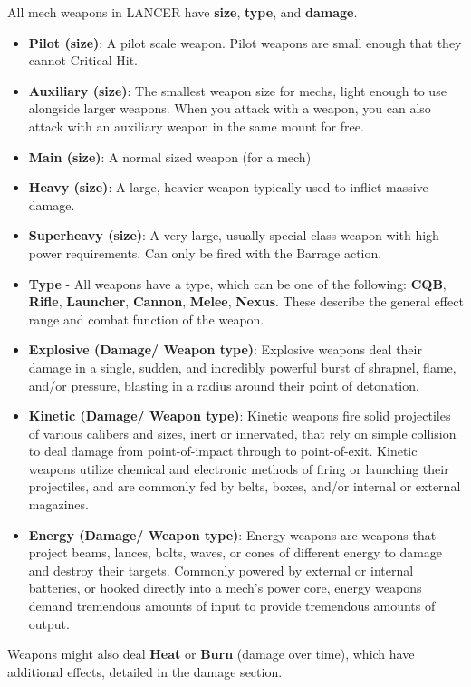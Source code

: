 All mech weapons in LANCER have \textbf{size}, \textbf{type}, and \textbf{damage}. 
\begin{itemize}
\item \textbf{Pilot (size)}: A pilot scale weapon. Pilot weapons are small enough that they cannot Critical Hit. 
\item \textbf{Auxiliary (size)}: The smallest weapon size for mechs, light enough to use alongside larger weapons. When you attack with a weapon, you can also attack with an auxiliary weapon in the same mount for free.
\item \textbf{Main (size)}: A normal sized weapon (for a mech)
\item \textbf{Heavy (size)}: A large, heavier weapon typically used to inflict massive damage.
\item \textbf{Superheavy (size)}: A very large, usually special-class weapon with high power requirements. Can only be fired with the Barrage action. 
\item \textbf{Type} - All weapons have a type, which can be one of the following: \textbf{CQB}, \textbf{Rifle}, \textbf{Launcher}, \textbf{Cannon}, \textbf{Melee}, \textbf{Nexus}. These describe the general effect range and combat function of the weapon. 
\item \textbf{Explosive (Damage/ Weapon type)}: Explosive weapons deal their damage in a single, sudden, and incredibly powerful burst of shrapnel, flame, and/or pressure, blasting in a radius around their point of detonation.
\item \textbf{Kinetic (Damage/ Weapon type)}: Kinetic weapons fire solid projectiles of various calibers and sizes, inert or innervated, that rely on simple collision to deal damage from point-of-impact through to point-of-exit. Kinetic weapons utilize chemical and electronic methods of firing or launching their projectiles, and are commonly fed by belts, boxes, and/or internal or external magazines.
\item \textbf{Energy (Damage/ Weapon type)}: Energy weapons are weapons that project beams, lances, bolts, waves, or cones of different energy to damage and destroy their targets. Commonly powered by external or internal batteries, or hooked directly into a mech’s power core, energy weapons demand tremendous amounts of input to provide tremendous amounts of output.
\end{itemize}
Weapons might also deal \textbf{Heat} or \textbf{Burn} (damage over time), which have additional effects, detailed in the damage section.

